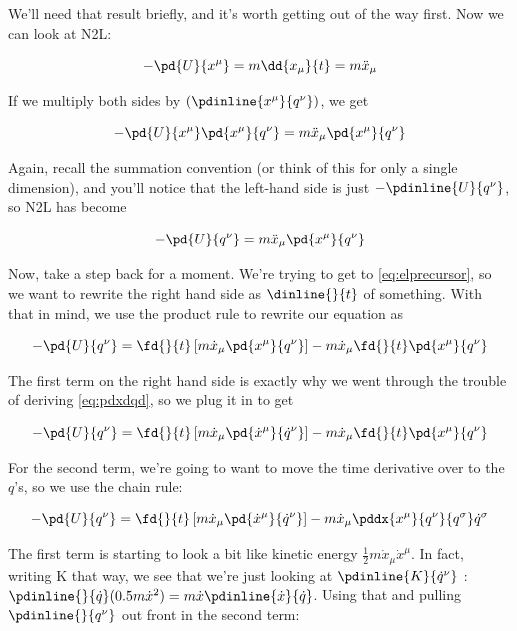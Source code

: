 \documentclass[12pt]{article}
\numberwithin{equation}{section}
\begin{document}
We'll need that result briefly, and it's worth getting out of the way first. Now we can look at N2L:

\begin{equation}
  \label{eq:n2lcart}
  -\pd{U}{x^\mu} = m\dd{x_\mu}{t} = m\ddot{x}_\mu
\end{equation}

If we multiply both sides by $(\pdinline{x^\mu}{q^\nu})$, we get 

\begin{equation}
  -\pd{U}{x^\mu}\pd{x^\mu}{q^\nu} = m\ddot{x}_\mu\pd{x^\mu}{q^\nu}
\end{equation}

Again, recall the summation convention (or think of this for only a single dimension), and you'll notice that the left-hand side is just $-\pdinline{U}{q^\nu}$, so N2L has become

\begin{equation}
  -\pd{U}{q^\nu} = m\ddot{x}_\mu\pd{x^\mu}{q^\nu}
\end{equation}

Now, take a step back for a moment. We're trying to get to \ref{eq:elprecursor}, so we want to rewrite the right hand side as $\dinline{}{t}$ of something. With that in mind, we use the product rule to rewrite our equation as 

\begin{equation}
  -\pd{U}{q^\nu} = \fd{}{t}\left[ m\dot{x}_\mu\pd{x^\mu}{q^\nu}\right] - m\dot{x}_\mu\fd{}{t}\pd{x^\mu}{q^\nu}
\end{equation}

The first term on the right hand side is exactly why we went through the trouble of deriving \ref{eq:pdxdqd}, so we plug it in to get

\begin{equation}
  -\pd{U}{q^\nu} = \fd{}{t}\left[ m\dot{x}_\mu\pd{\dot{x}^\mu}{\dot{q}^\nu}\right] - m\dot{x}_\mu\fd{}{t}\pd{x^\mu}{q^\nu}
\end{equation}

For the second term, we're going to want to move the time derivative over to the $q$'s, so we use the chain rule:

\begin{equation}
  -\pd{U}{q^\nu} = \fd{}{t}\left[ m\dot{x}_\mu\pd{\dot{x}^\mu}{\dot{q}^\nu}\right] - m\dot{x}_\mu\pddx{x^\mu}{q^\nu}{q^\sigma}\dot{q}^\sigma
\end{equation}

The first term is starting to look a bit like kinetic energy $\frac{1}{2}m\dot{x}_\mu\dot{x}^\mu$. In fact, writing K that way, we see that we're just looking at $\pdinline{K}{\dot{q}^\nu}$ : $\pdinline{}{\dot{q}}(0.5m\dot{x}^2) = m\dot{x}\pdinline{\dot{x}}{\dot{q}}$. Using that and pulling $\pdinline{}{q^\nu}$ out front in the second term:
\end{document}
